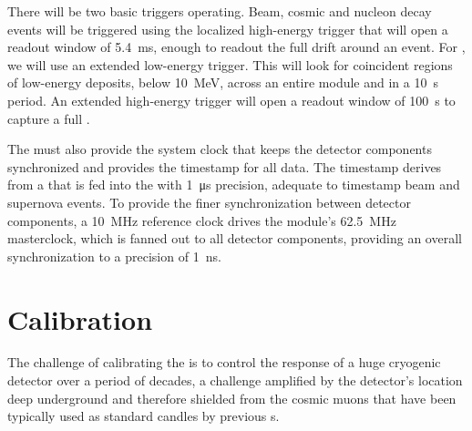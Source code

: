 There will be two basic triggers operating. Beam, cosmic and nucleon decay events will be triggered using the localized high-energy trigger %
that will open a readout window of \SI{5.4}{\ms}, enough to readout the full  drift around an event. For , we will use an extended low-energy trigger. This will look for coincident regions of low-energy deposits, below \SI{10}{\mega\electronvolt}, across an entire module and in a \SI{10}{\second} period. An extended high-energy trigger will open a readout window of \SI{100}{\second} to capture a full . %

The  must also provide the system clock that keeps the detector components synchronized and provides the timestamp for all data. The timestamp derives from a   that is fed into the  with \SI{1}{\micro\second} precision, adequate to timestamp beam and supernova events. To provide the finer synchronization between detector components, a \SI{10}{\mega\hertz} reference clock drives the module's \SI{62.5}{\mega\hertz} masterclock, which is fanned out to all detector components, providing an overall synchronization to a precision of \SI{1}{\nano\second}.

\section{Calibration}
\label{sec:exec-sp-calibration}

The challenge of calibrating the   is to control the response of a huge cryogenic detector over a period of decades, a challenge amplified by the detector's location deep underground and therefore shielded from the cosmic muons that have been typically used as standard candles by previous s.

